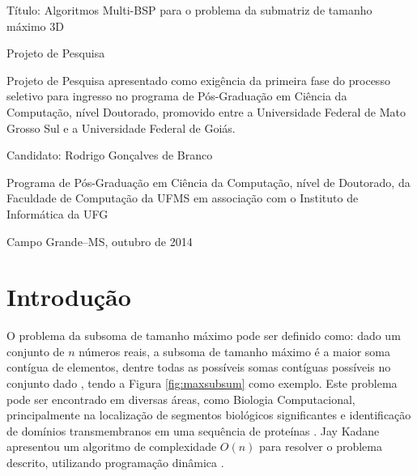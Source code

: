 \documentclass[a4paper, 12pt] {article}
\begin{document}
\thispagestyle{empty}
\begin{center}

\vskip 2.2cm

\Large{Título: Algoritmos Multi-BSP para o problema da submatriz de tamanho
máximo 3D}

\vskip 1.5cm

\Large{Projeto de Pesquisa}

\vskip 1.5cm

\Large{Projeto de Pesquisa apresentado como exigência da primeira fase do
processo seletivo para ingresso no programa de Pós-Graduação em Ciência
da Computação, nível Doutorado, promovido entre a Universidade
Federal de Mato Grosso Sul e a Universidade Federal de Goiás.}

\vskip 2.5cm

\Large{Candidato: Rodrigo Gonçalves de Branco}

\vskip 2.0cm


\vskip 2.5cm

\large{Programa de Pós-Graduação em Ciência da Computação, nível de Doutorado,
da Faculdade de Computação da UFMS em associação com o Instituto de Informática da UFG}

\vskip 1.3cm

Campo Grande--MS, outubro de 2014

\end{center}

\clearpage
\onehalfspacing

\section{Introdução}

O problema da subsoma de tamanho máximo pode ser definido como: dado um conjunto
de $n$ números reais, a subsoma de tamanho máximo é a maior soma contígua de
elementos, dentre todas as possíveis somas contíguas possíveis no conjunto
dado \cite{bentley2000programming}, tendo a Figura \ref{fig:maxsubsum} como
exemplo. Este problema pode ser encontrado em diversas áreas, como Biologia
Computacional, principalmente na localização de segmentos biológicos significantes e identificação de domínios
transmembranos em uma sequência de proteínas \cite{bae2007}. Jay Kadane
apresentou um algoritmo de complexidade $O(n)$ para resolver o problema descrito, utilizando 
programação dinâmica \cite{bentley2000programming}.
\end{document}
